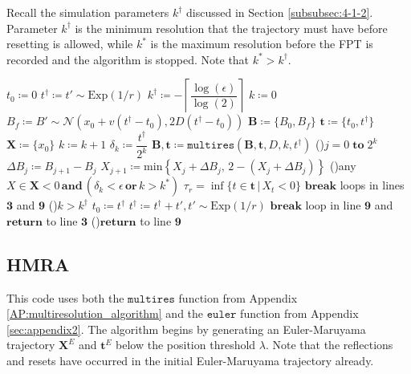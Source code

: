 \documentclass[preprint,12pt]{elsarticle}
\numberwithin{equation}{section}
\theoremstyle{plain} \newtheorem{theorem}{Theorem}[section]
\theoremstyle{plain} \newtheorem{proposition}[theorem]{Proposition}
\theoremstyle{plain} \newtheorem{lemma}[theorem]{Lemma}
\theoremstyle{plain} \newtheorem{corollary}[theorem]{Corollary}
\theoremstyle{definition} \newtheorem{definition}[theorem]{Definition}
\theoremstyle{definition} \newtheorem{notation}[theorem]{Notation}
\theoremstyle{remark} \newtheorem{remark}[theorem]{Remark}
\theoremstyle{remark} \newtheorem{remarks}[theorem]{Remarks}
\theoremstyle{remark} \newtheorem{algorithm2}[theorem]{Algorithm}
\theoremstyle{remark} \newtheorem{example}[theorem]{Example}
\begin{document}
\begin{appendices}
Recall the simulation parameters $k^\dag$ discussed in Section \ref{subsubsec:4-1-2}. Parameter $k^\dag$ is the minimum resolution that the trajectory must have before resetting is allowed, while $k^*$ is the maximum resolution before the FPT is recorded and the algorithm is stopped. Note that $k^*>k^\dag$.

\vspace{5mm}

\begin{algorithm}[H]
\caption{SMRA}
\LinesNumbered
{}
$t_0 \coloneqq 0$ \;
$t^\dag \coloneqq t' \sim \mathrm{Exp}(1/r)$ \;
$k^{\dag} \coloneqq - \left\lceil \dfrac{\log(\epsilon)}{\log(2)}\right\rceil$ \;
{
$k \coloneqq 0$ \;
$B_{f} \coloneqq B' \sim \mathcal{N}(x_0+v(t^\dag-t_0),2D(t^\dag-t_0))$ \;
$\mathbf{B} \coloneqq \{B_{0}, B_{f}\}$ \;
$\mathbf{t} \coloneqq \{t_0,t^\dag \}$ \;
$\mathbf{X} \coloneqq \{x_0\}$ \;
{
$k \coloneqq k+1$ \;
$\delta_k \coloneqq \dfrac{t^\dag}{2^k}$ \;
$\mathbf{B}, \mathbf{t} \coloneqq \texttt{multires}(\mathbf{B}, \mathbf{t}, D, k, t^\dag)$ \;
\For(){$j = 0 \; \mathbf{to} \; 2^k$}{
$\Delta B_j \coloneqq B_{j+1}-B_j$ \;
$X_{j+1} \coloneqq \mathrm{min}\left\{ X_{j} + \Delta B_{j}, \, 2- (X_{j} + \Delta B_{j}) \right\}$  \;
}
\uIf(){any $X \in \mathbf{X} < 0 \, \mathbf{and} \, (\delta_k<\epsilon \, \mathbf{or} \, k>k^*)$}{
$\tau_r = \inf \{t \in \mathbf{t} \, \vert \, X_{t}<0 \}$ \;
$\mathbf{break}$ loops in lines $\mathbf{3}$ and $\mathbf{9}$
}
\uElseIf(){$k>k^\dag$}
{
$t_0 \coloneqq t^\dag$ \;
$t^\dag \coloneqq t^\dag + t', t' \sim \mathrm{Exp}(1/r) $ \;
$\mathbf{break}$ loop in line $\mathbf{9}$ and $\mathbf{return}$ to line $\mathbf{3}$
}
\uElse(){$\mathbf{return}$ to line $\mathbf{9}$}
}
}
\end{algorithm}

\newpage

\subsection{HMRA}
\label{sec:appendix4}

This code uses both the $\texttt{multires}$ function from Appendix \ref{AP:multiresolution_algorithm} and the $\texttt{euler}$ function from Appendix \ref{sec:appendix2}. The algorithm begins by generating an Euler-Maruyama trajectory $\mathbf{X}^E$ and $\mathbf{t}^E$ below the position threshold $\lambda$. Note that the reflections and resets have occurred in the initial Euler-Maruyama trajectory already.
\vspace{2mm}


\end{appendices}
\end{document}
